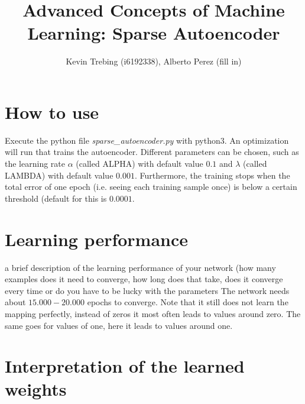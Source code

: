 \documentclass[a4paper]{article}
\title{Advanced Concepts of Machine Learning: Sparse Autoencoder}
\author{Kevin Trebing (i6192338), Alberto Perez (fill in)}
\begin{document}
\maketitle

\section{How to use}
Execute the python file \textit{sparse\_autoencoder.py} with python3. An optimization will run that trains the autoencoder. Different parameters can be chosen, such as the learning rate $\alpha$ (called ALPHA) with default value $0.1$ and $\lambda$ (called LAMBDA) with default value $0.001$. Furthermore, the training stops when the total error of one epoch (i.e. seeing each training sample once) is below a certain threshold (default for this is $0.0001$.

\section{Learning performance}
a brief description of the learning performance of your network (how many examples does it need to converge, how long does that take, does it converge every time or do you have to be lucky with the parameters
The network needs about $15.000-20.000$ epochs to converge. Note that it still does not learn the mapping perfectly, instead of zeros it most often leads to values around zero. The same goes for values of one, here it leads to values around one.

\section{Interpretation of the learned weights}
\end{document}
